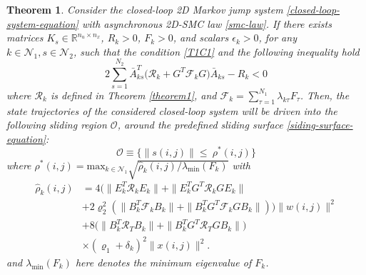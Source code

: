 \documentclass[conference]{IEEEtran}
\newtheorem{theorem}{Theorem}
\begin{document}
\begin{theorem}\label{theorem2}	
	Consider the closed-loop 2D Markov jump system \eqref{closed-loop-system-equation} with asynchronous 2D-SMC law \eqref{smc-law}. If there exists matrices $K_{s}\in\mathbb{R}^{n_u\times n_x}$, $R_{k}>0$, $F_{k}>0$, and  scalars $\epsilon_{k}>0$, for any $k\in\mathcal{N}_{1}, s\in\mathcal{N}_{2}$, such that the condition \eqref{T1C1} and the following inequality hold
	\begin{equation} \label{T2C1}
		2\sum_{s=1}^{N_{2}} \bar{A}^{T}_{ks}\big(\mathcal{R}_{k}+G^{T}\mathcal{F}_{k}G\big)\bar{A}_{ks}-R_{k} <0
	\end{equation}
	where $\mathcal{R}_{k}$ is defined in Theorem \ref{theorem1}, and $\mathcal{F}_{k}=\sum_{\tau=1}^{N_{1}}\lambda_{k\tau}F_{\tau}$. Then, the state trajectories of the considered closed-loop system will be driven into the following sliding region $\mathcal{O}$, around the predefined sliding surface \eqref{siding-surface-equation}:
	\begin{equation}\label{smc-region}
		\mathcal{O}\equiv\Big\{\|s(i,j)\|\leq\ \rho^{*}(i,j) \Big\}
	\end{equation} 
	where $\rho^{*}(i,j) = \mathrm{max}_{k\in\mathcal{N}_{1}}\sqrt{\hat{\rho}_{k}(i,j)/
	\lambda_{\mathrm{min}}(F_{k})}$ with
	\begin{equation*}
		 \begin{split}
		 	\hat{\rho}_{k}(i,j)&=4\big(\|E^{T}_{k}\mathcal{R}_{k}E_{k}\|+ \|E^{T}_{k}G^{T}\mathcal{R}_{k}GE_{k}\|\\
		 	&+2\varrho_{2}^{2}(\|B^{T}_{k}\mathcal{F}_{k}B_{k}\|+ \|B^{T}_{k}G^{T}\mathcal{F}_{k}GB_{k}\| )\big)\|w(i,j)\|^{2}\\
		 	&+8\big(\|B^{T}_{k}\mathcal{R}_{T}B_{k}\|+\|B^{T}_{k}G^{T}\mathcal{R}_{T}GB_{k}\|\big)\\ &\times(\varrho_{1}+\delta_{k})^{2}\|x(i,j)\|^{2}.
		 \end{split}
	\end{equation*}
	and $\lambda_{\mathrm{min}}(F_{k})$ here denotes the minimum eigenvalue of $F_{k}$.
\end{theorem} 
\end{document}
